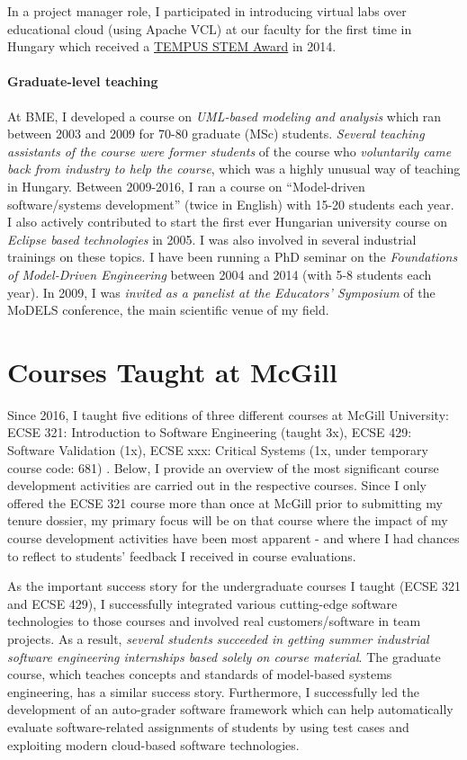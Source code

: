 \documentclass[a4paper,11pt]{report}
\begin{document}
In a project manager role, I participated in introducing virtual labs over educational cloud (using Apache VCL) at our faculty for the first time in Hungary which received a \href{https://inf.mit.bme.hu/en/news/2014/02/tempus-stem-call-apache-vcl-based-labs-won-prize}{TEMPUS STEM Award} in 2014. 

\paragraph{Graduate-level teaching}
At BME, I developed a course on \emph{UML-based modeling and analysis} which ran between 2003 and 2009 for 70-80 graduate (MSc) students. \emph{Several teaching assistants of the course were former students} of the course who \emph{voluntarily came back from industry to help the course}, which was a highly unusual way of teaching in Hungary. Between 2009-2016, I ran a course on “Model-driven software/systems development” (twice in English) with 15-20 students each year. I also actively contributed to start the first ever Hungarian university course on \emph{Eclipse based technologies} in 2005. I was also involved in several industrial trainings on these topics. I have been running a PhD seminar on the \emph{Foundations of Model-Driven Engineering} between 2004 and 2014 (with 5-8 students each year). In 2009, I was \emph{invited as a panelist at the Educators' Symposium} of the MoDELS conference, the main scientific venue of my field. 


\section{Courses Taught at McGill}
Since 2016, I taught five editions of three different courses at McGill University: ECSE 321: Introduction to Software Engineering (taught 3x), ECSE 429: Software Validation (1x), ECSE xxx: Critical Systems (1x, under temporary course code: 681) . Below, I provide an overview of the most significant course development activities are carried out in the respective courses. 
Since I only offered the ECSE 321 course more than once at McGill prior to submitting my tenure dossier, my primary focus will be on that course where the impact of my course development activities have been most apparent - and where I had chances to reflect to students' feedback I received in course evaluations.  

As the important success story for the undergraduate courses I taught (ECSE 321 and ECSE 429), I successfully integrated various cutting-edge software technologies to those courses and involved real customers/software in team projects. As a result, \emph{several students succeeded in getting summer industrial software engineering internships based solely on course material}. The graduate course, which teaches concepts and standards of model-based systems engineering, has a similar success story. Furthermore, I successfully led the development of an auto-grader software framework which can help automatically evaluate software-related assignments of students by using test cases and exploiting modern cloud-based software technologies.
\end{document}
